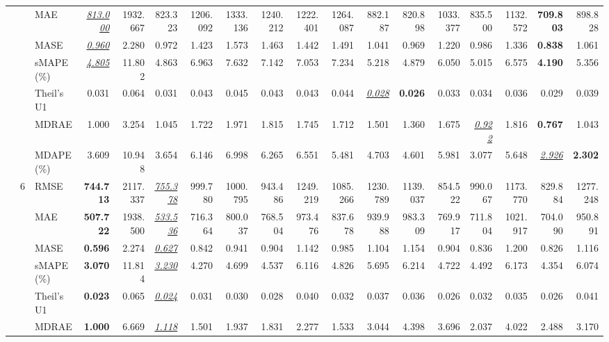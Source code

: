 \begin{table}[!htbp]
{\begin{tabular}{lllrrrrrrrrrrrrrrr}
 &  & MAE & \underline{\textit{813.000}} & 1932.667 & 823.323 & 1206.092 & 1333.136 & 1240.212 & 1222.401 & 1264.087 & 882.187 & 820.898 & 1033.377 & 835.500 & 1132.572 & \textbf{709.803} & 898.828 \\
 &  & MASE & \underline{\textit{0.960}} & 2.280 & 0.972 & 1.423 & 1.573 & 1.463 & 1.442 & 1.491 & 1.041 & 0.969 & 1.220 & 0.986 & 1.336 & \textbf{0.838} & 1.061 \\
 &  & sMAPE (\%) & \underline{\textit{4.805}} & 11.802 & 4.863 & 6.963 & 7.632 & 7.142 & 7.053 & 7.234 & 5.218 & 4.879 & 6.050 & 5.015 & 6.575 & \textbf{4.190} & 5.356 \\
 &  & Theil's U1 & 0.031 & 0.064 & 0.031 & 0.043 & 0.045 & 0.043 & 0.043 & 0.044 & \underline{\textit{0.028}} & \textbf{0.026} & 0.033 & 0.034 & 0.036 & 0.029 & 0.039 \\
 &  & MDRAE & 1.000 & 3.254 & 1.045 & 1.722 & 1.971 & 1.815 & 1.745 & 1.712 & 1.501 & 1.360 & 1.675 & \underline{\textit{0.922}} & 1.816 & \textbf{0.767} & 1.043 \\
 &  & MDAPE (\%) & 3.609 & 10.948 & 3.654 & 6.146 & 6.998 & 6.265 & 6.551 & 5.481 & 4.703 & 4.601 & 5.981 & 3.077 & 5.648 & \underline{\textit{2.926}} & \textbf{2.302} \\
\cmidrule(lr){2-18}
 & 6 & RMSE & \textbf{744.713} & 2117.337 & \underline{\textit{755.378}} & 999.780 & 1000.795 & 943.486 & 1249.219 & 1085.266 & 1230.789 & 1139.037 & 854.522 & 990.067 & 1173.770 & 829.884 & 1277.248 \\
 &  & MAE & \textbf{507.722} & 1938.500 & \underline{\textit{533.536}} & 716.364 & 800.037 & 768.504 & 973.476 & 837.678 & 939.988 & 983.309 & 769.917 & 711.804 & 1021.917 & 704.090 & 950.891 \\
 &  & MASE & \textbf{0.596} & 2.274 & \underline{\textit{0.627}} & 0.842 & 0.941 & 0.904 & 1.142 & 0.985 & 1.104 & 1.154 & 0.904 & 0.836 & 1.200 & 0.826 & 1.116 \\
 &  & sMAPE (\%) & \textbf{3.070} & 11.814 & \underline{\textit{3.230}} & 4.270 & 4.699 & 4.537 & 6.116 & 4.826 & 5.695 & 6.214 & 4.722 & 4.492 & 6.173 & 4.354 & 6.074 \\
 &  & Theil's U1 & \textbf{0.023} & 0.065 & \underline{\textit{0.024}} & 0.031 & 0.030 & 0.028 & 0.040 & 0.032 & 0.037 & 0.036 & 0.026 & 0.032 & 0.035 & 0.026 & 0.041 \\
 &  & MDRAE & \textbf{1.000} & 6.669 & \underline{\textit{1.118}} & 1.501 & 1.937 & 1.831 & 2.277 & 1.533 & 3.044 & 4.398 & 3.696 & 2.037 & 4.022 & 2.488 & 3.170 \\

\end{tabular}}
\end{table}
